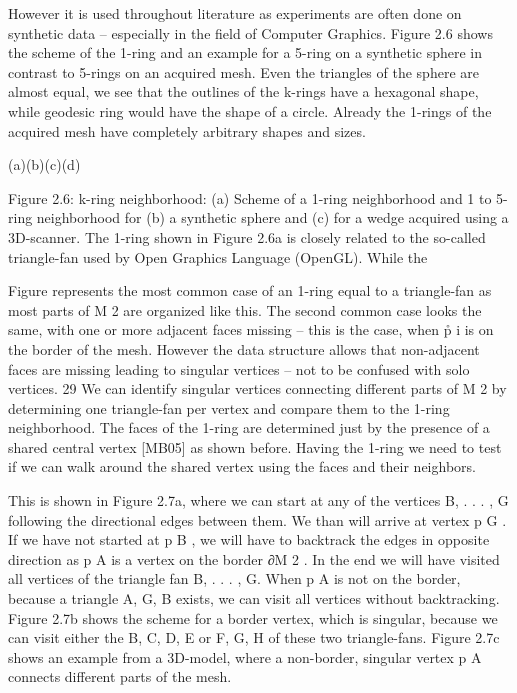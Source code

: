 However it is used throughout literature as experiments are often done on synthetic data – especially in the field of Computer Graphics. Figure 2.6 shows the scheme of the 1-ring and an example for a 5-ring on a synthetic sphere in contrast to 5-rings on an acquired mesh. Even the triangles of the sphere are almost equal, we see that the outlines of the k-rings have a hexagonal shape, while geodesic ring would have the shape of a circle. Already the 1-rings of the acquired mesh have completely arbitrary shapes and sizes.

(a)(b)(c)(d)

Figure 2.6: k-ring neighborhood: (a) Scheme of a 1-ring neighborhood and 1 to 5-ring neighborhood for (b) a synthetic sphere and (c) for a wedge acquired using a 3D-scanner. The 1-ring shown in Figure 2.6a is closely related to the so-called triangle-fan used by Open Graphics Language (OpenGL). While the

Figure represents the most common case of an 1-ring equal to a triangle-fan as most parts of M 2 are organized like this. The second common case looks the same, with one or more adjacent faces missing – this is the case, when p̊ i is on the border of the mesh. However the data structure allows that non-adjacent faces are missing leading to singular vertices – not to be confused with solo vertices. 29 We can identify singular vertices connecting different parts of M 2 by determining one triangle-fan per vertex and compare them to the 1-ring neighborhood. The faces of the 1-ring are determined just by the presence of a shared central vertex [MB05] as shown before. Having the 1-ring we need to test if we can walk around the shared vertex using the faces and their neighbors.

This is shown in Figure 2.7a, where we can start at any of the vertices {B, . . . , G} following the directional edges between them. We than will arrive at vertex p G . If we have not started at p B , we will have to backtrack the edges in opposite direction as p A is a vertex on the border ∂M 2 . In the end we will have visited all vertices of the triangle fan {B, . . . , G}. When p A is not on the border, because a triangle {A, G, B} exists, we can visit all vertices without backtracking. Figure 2.7b shows the scheme for a border vertex, which is singular, because we can visit either the {B, C, D, E} or {F, G, H} of these two triangle-fans. Figure 2.7c shows an example from a 3D-model, where a non-border, singular vertex p A connects different parts of the mesh.

